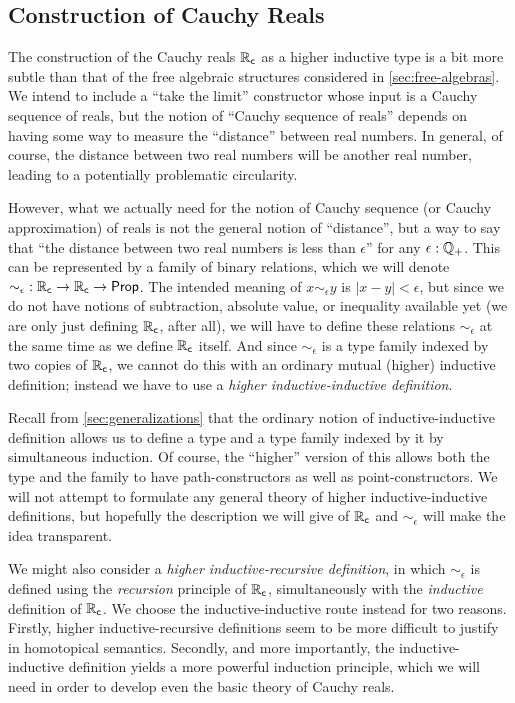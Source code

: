 \subsection{Construction of Cauchy Reals}
\label{sec:constr-cauchy-reals}

The construction of the Cauchy reals $\mathbb{R}_\mathsf{c}$ as a higher inductive type is a bit more subtle than that of the free algebraic structures considered in \autoref{sec:free-algebras}.
We intend to include a ``take the limit'' constructor whose input is a Cauchy sequence of reals, but the notion of ``Cauchy sequence of reals'' depends on having some way to measure the ``distance'' between real numbers.
In general, of course, the distance between two real numbers will be another real number, leading to a potentially problematic circularity.

However, what we actually need for the notion of Cauchy sequence (or Cauchy approximation) of reals is not the general notion of ``distance'', but a way to say that ``the distance between two real numbers is less than $\epsilon$'' for any $\epsilon:\mathbb{Q}_{+}$.
This can be represented by a family of binary relations, which we will denote $\mathord{\sim_\epsilon} : \mathbb{R}_\mathsf{c}\to\mathbb{R}_\mathsf{c}\to \mathsf{Prop}$.
The intended meaning of $x \sim_\epsilon y$ is $|x - y| < \epsilon$, but since we do not have notions of subtraction, absolute value, or inequality available yet (we are only just defining $\mathbb{R}_\mathsf{c}$, after all), we will have to define these relations $\sim_\epsilon$ at the same time as we define $\mathbb{R}_\mathsf{c}$ itself.
And since $\sim_\epsilon$ is a type family indexed by two copies of $\mathbb{R}_\mathsf{c}$, we cannot do this with an ordinary mutual (higher) inductive definition; instead we have to use a \emph{higher inductive-inductive definition}.

Recall from \autoref{sec:generalizations} that the ordinary notion of inductive-inductive definition allows us to define a type and a type family indexed by it by simultaneous induction.
Of course, the ``higher'' version of this allows both the type and the family to have path-constructors as well as point-constructors.
We will not attempt to formulate any general theory of higher inductive-inductive definitions, but hopefully the description we will give of $\mathbb{R}_\mathsf{c}$ and $\sim_\epsilon$ will make the idea transparent.

\begin{rmk}
  We might also consider a \emph{higher inductive-recursive definition}, in which $\sim_\epsilon$ is defined using the \emph{recursion} principle of $\mathbb{R}_\mathsf{c}$, simultaneously with the \emph{inductive} definition of $\mathbb{R}_\mathsf{c}$.
  We choose the inductive-inductive route instead for two reasons.
  Firstly, higher inductive-recursive definitions seem to be more difficult to justify in homotopical semantics.
  Secondly, and more importantly, the inductive-inductive definition yields a more powerful induction principle, which we will need in order to develop even the basic theory of Cauchy reals.
\end{rmk}


